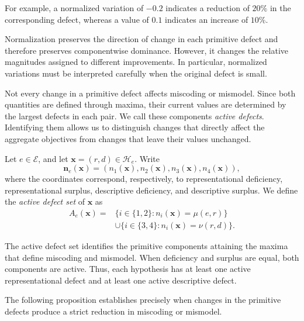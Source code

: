 For example, a normalized variation of $-0.2$ indicates a reduction of $20\%$ in the corresponding defect, whereas a value of $0.1$ indicates an increase of $10\%$.

Normalization preserves the direction of change in each primitive defect and therefore preserves componentwise dominance. However, it changes the relative magnitudes assigned to different improvements. In particular, normalized variations must be interpreted carefully when the original defect is small.

Not every change in a primitive defect affects miscoding or mismodel. Since both quantities are defined through maxima, their current values are determined by the largest defects in each pair. We call these components \emph{active defects}. Identifying them allows us to distinguish changes that directly affect the aggregate objectives from changes that leave their values unchanged.

\begin{definition}
Let $e\in\mathcal E$, and let $\mathbf{x}=(r,d)\in\mathcal H_e$. Write
\[
\mathbf n_e(\mathbf{x}) = (n_1(\mathbf{x}),n_2(\mathbf{x}),
 n_3(\mathbf{x}),n_4(\mathbf{x})),
\]
where the coordinates correspond, respectively, to representational deficiency, representational surplus, descriptive deficiency, and descriptive surplus. We define the \emph{active defect set}  of $\mathbf{x}$ as
\[
\begin{aligned}
A_e(\mathbf{x})={}
& \{i\in\{1,2\}:n_i(\mathbf{x})=\mu(e,r)\}\\
&\cup \{i\in\{3,4\}:n_i(\mathbf{x})=\nu(r,d)\}.
\end{aligned}
\]
\end{definition}

The active defect set identifies the primitive components attaining the maxima that define miscoding and mismodel. When deficiency and surplus are equal, both components are active. Thus, each hypothesis has at least one active representational defect and at least one active descriptive defect.

The following proposition establishes precisely when changes in the primitive defects produce a strict reduction in miscoding or mismodel.

